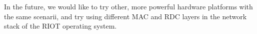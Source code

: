\documentclass[12pt,a4paper]{article}
\begin{document}
In the future, we would like to try other, more powerful hardware platforms
with the same scenarii, and try using different MAC and RDC layers in
the network stack of the RIOT operating system.






{\small
}
\end{document}
